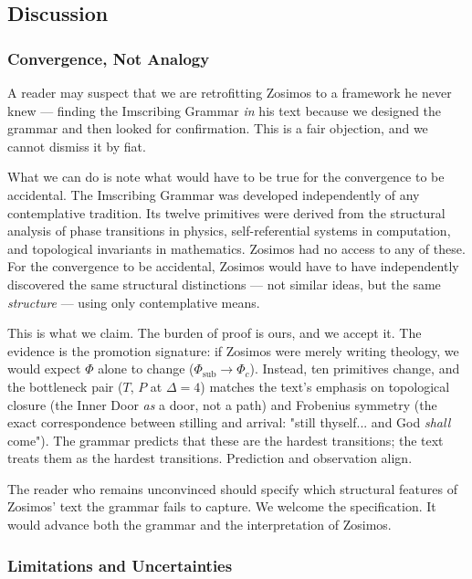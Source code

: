 \documentclass[12pt,a4paper]{article}
\begin{document}
\subsection{Discussion}

\subsubsection{Convergence, Not Analogy}

A reader may suspect that we are retrofitting Zosimos to a framework he never knew --- finding the Imscribing Grammar \emph{in} his text because we designed the grammar and then looked for confirmation. This is a fair objection, and we cannot dismiss it by fiat.

What we can do is note what would have to be true for the convergence to be accidental. The Imscribing Grammar was developed independently of any contemplative tradition. Its twelve primitives were derived from the structural analysis of phase transitions in physics, self-referential systems in computation, and topological invariants in mathematics. Zosimos had no access to any of these. For the convergence to be accidental, Zosimos would have to have independently discovered the same structural distinctions --- not similar ideas, but the same \emph{structure} --- using only contemplative means.

This is what we claim. The burden of proof is ours, and we accept it. The evidence is the promotion signature: if Zosimos were merely writing theology, we would expect $\Phi$ alone to change ($\Phi_\text{sub} \to \Phi_c$). Instead, ten primitives change, and the bottleneck pair ($T$, $P$ at $\Delta = 4$) matches the text's emphasis on topological closure (the Inner Door \emph{as} a door, not a path) and Frobenius symmetry (the exact correspondence between stilling and arrival: "still thyself... and God \emph{shall} come"). The grammar predicts that these are the hardest transitions; the text treats them as the hardest transitions. Prediction and observation align.

The reader who remains unconvinced should specify which structural features of Zosimos' text the grammar fails to capture. We welcome the specification. It would advance both the grammar and the interpretation of Zosimos.

\subsubsection{Limitations and Uncertainties}
\end{document}
